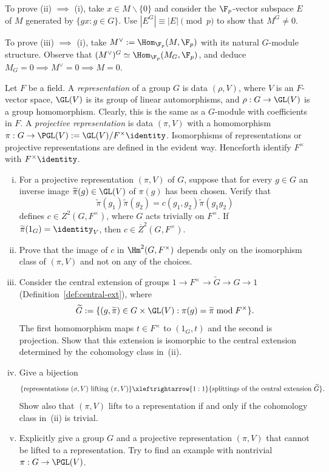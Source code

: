 \begin{Exercises}
	\begin{hint}
		To prove (ii) $\implies$ (i), take
		$x\in M\smallsetminus\{0\}$ and consider the $\F_p$-vector subspace
		$E$ of $M$ generated by $\{gx:g\in G\}$. Use
		$|E^G|\equiv|E|\pmod p$ to show that $M^G\neq0$.

		To prove (iii) $\implies$ (i), take
		$M^\vee:=\Hom_{\F_p}(M,\F_p)$ with its natural $G$-module structure.
		Observe that
		$(M^\vee)^G\simeq\Hom_{\F_p}(M_G,\F_p)$, and deduce
		$M_G=0\implies M^\vee=0\implies M=0$.
	\end{hint}

	\item Let $F$ be a field. A \emph{representation} of a group $G$ is data
	$(\rho,V)$, where $V$ is an $F$-vector space, $\GL(V)$ is its group of
	linear automorphisms, and $\rho:G\to\GL(V)$ is a group homomorphism.
	Clearly, this is the same as a $G$-module with coefficients in $F$. A
	\emph{projective representation} is data $(\pi,V)$ with a homomorphism
	$\pi:G\to\PGL(V):=\GL(V)/F^\times\identity$. Isomorphisms of
	representations or projective representations are defined in the evident
	way. Henceforth identify $F^\times$ with $F^\times\identity$.

	\begin{enumerate}[(i)]
		\item For a projective representation $(\pi,V)$ of $G$, suppose that
		for every $g\in G$ an inverse image
		$\widetilde\pi(g)\in\GL(V)$ of $\pi(g)$ has been chosen. Verify that
		\[ \widetilde\pi(g_1)\widetilde\pi(g_2)
		=c(g_1,g_2)\widetilde\pi(g_1g_2) \]
		defines $c\in Z^2(G,F^\times)$, where $G$ acts trivially on
		$F^\times$. If $\widetilde\pi(1_G)=\identity_V$, then
		$c\in\overline{Z}^2(G,F^\times)$.
		\item Prove that the image of $c$ in $\Hm^2(G,F^\times)$ depends only
		on the isomorphism class of $(\pi,V)$ and not on any of the choices.
		\item Consider the central extension of groups
		$1\to F^\times\to\widetilde G\to G\to1$
		(Definition~\ref{def:central-ext}), where
		\[ \widetilde G:=\{(g,\widetilde\pi)\in G\times\GL(V):
		\pi(g)=\widetilde\pi\bmod F^\times\}. \]
		The first homomorphism maps $t\in F^\times$ to $(1_G,t)$ and the
		second is projection. Show that this extension is isomorphic to the
		central extension determined by the cohomology class in~(ii).
		\item Give a bijection
		\[ \{\text{representations }(\sigma,V)\text{ lifting }(\pi,V)\}
		\xleftrightarrow{1:1}
		\{\text{splittings of the central extension }\widetilde G\}. \]
		Show also that $(\pi,V)$ lifts to a representation if and only if the
		cohomology class in~(ii) is trivial.
		\item Explicitly give a group $G$ and a projective representation
		$(\pi,V)$ that cannot be lifted to a representation. Try to find an
		example with nontrivial $\pi:G\to\PGL(V)$.
	\end{enumerate}


\end{Exercises}
